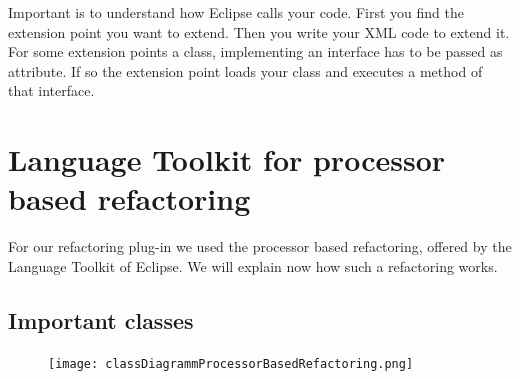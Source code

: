 \documentclass[a4paper,10pt]{report}
\begin{document}
Important is to understand how Eclipse calls your code. First you find the extension point you want to extend. Then you write your XML code to extend it. For some extension points a class, implementing an interface has to be passed as attribute. If so the extension point loads your class and executes a method of that interface.


\chapter{Language Toolkit for processor based refactoring}
\label{languageToolkitForProcessorBasedRefactoring}
For our refactoring plug-in we used the processor based refactoring, offered by the Language Toolkit of Eclipse. We will explain now how such a refactoring works.
\section{Important classes}
\label{languageToolkitClasses}
\begin{figure}[h]
\centering
\texttt{[image: classDiagrammProcessorBasedRefactoring.png]}
\end{figure}
\end{document}
